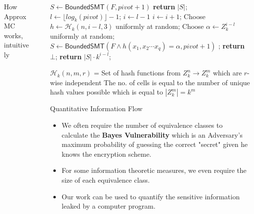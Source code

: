 \documentclass[final]{beamer}
\newlength{\sepwidth}
\newlength{\colwidth}
\newcommand{\separatorcolumn}{\begin{column}{\sepwidth}\end{column}}
\begin{document}
\begin{frame}[t]
\begin{columns}[t]
\begin{column}{\colwidth}
\begin{block}{How ApproxMC works, intuitively}
  \end{block}

\end{column}

\separatorcolumn

\begin{column}{\colwidth}

  \begin{block}{}
\begin{algorithm}[H]
	\caption{$\mathsf{ApproxMCCore}(F,pivot)$}
\begin{algorithmic}[1]
	\State $S \gets \mathsf{BoundedSMT}(F, pivot + 1)$
		\State \textbf{return} $|S|$;
	\Else
		\State $l \gets \lfloor log_{k}(pivot) \rfloor - 1$; $i \gets l - 1$
		\Repeat
		\State $i \gets i + 1$;
		\State Choose $h \gets \mathcal{H}_k(n, i - l , 3)$ uniformly at random;
		\State Choose $\alpha \gets Z_k^{i - l}$ uniformly at random;
		\State $S \gets \mathsf{BoundedSMT}(F \wedge h(x_1,x_2\cdots x_q) = \alpha, pivot + 1)$
		;
	\EndIf
		\State \textbf{return} $\bot$;
	\Else 
		\State \textbf{return} $|S|\cdot k ^{i - l}$;
	\EndIf

    \end{algorithmic}
\end{algorithm}

    $\mathcal{H}_k(n,m,r)$ = Set of hash functions from $Z_k^{n} \rightarrow Z_k^{m}$ which are  $r$-wise independent
    The no. of cells is equal to the number of unique hash values possible which is equal to $|Z_k^m| = k^m$
  \end{block}

  \begin{block}{Quantitative Information Flow}

    \begin{itemize}
        \item We often require the number of equivalence classes to calculate the \textbf{Bayes Vulnerability} which is an Adversary's maximum probability of guessing the correct "secret" given he knows the encryption scheme.
        \item For some information theoretic measures, we even require the size of each equivalence class.
        \item Our work can be used to quantify the sensitive information leaked by a computer program.
    \end{itemize}


\end{block}
\end{column}
\end{columns}
\end{frame}
\end{document}
